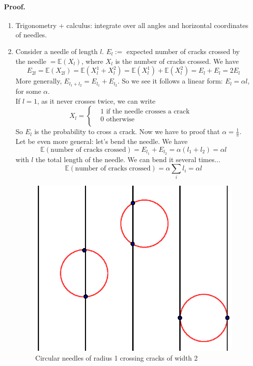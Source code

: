 \paragraph*{Proof.}
\begin{enumerate}
\item Trigonometry + calculus: integrate over all angles and horizontal coordinates of needles.
\item Consider a needle of length $l$.
$E_l := $ expected number of cracks crossed by the needle $= \mathbb{E}(X_l)$, where $X_l$ is the number of cracks crossed. We have
$$
E_{2l} = \mathbb{E}(X_{2l}) = \mathbb{E}(X_l^1+X_l^2) = \mathbb{E}(X_l^1) + \mathbb{E}(X_l^2) = E_l + E_l = 2E_l
$$
More generally, $E_{l_1+l_2} = E_{l_1} + E_{l_2}$. So we see it follows a linear form: $E_l = \alpha l$, for some $\alpha$.\\
If $l=1$, as it never crosses twice, we can write 
$$
X_l = \left\{
      \begin{aligned}
        &1 \text{ if the needle crosses a crack}& \\
        &0 \text{ otherwise}& \\
      \end{aligned}
    \right.
$$
    So $E_l$ is the probability to cross a crack. Now we have to proof that $\alpha = \frac{1}{\pi}$.\\
Let be even more general: let's bend the needle. We have
$$
\mathbb{E}(\text{number of cracks crossed}) = E_{l_1} + E_{l_2}
= \alpha (l_1 + l_2)
= \alpha l
$$
with $l$ the total length of the needle. We can bend it several times...
$$
\mathbb{E}(\text{number of cracks crossed}) = \alpha \sum_i l_i = \alpha l
$$

\begin{figure}[h]
\centering
\includegraphics[scale=0.7]{images/circles.eps}
\caption{Circular needles of radius 1 crossing cracks of width 2}
\label{circles}
\end{figure}


\end{enumerate}
